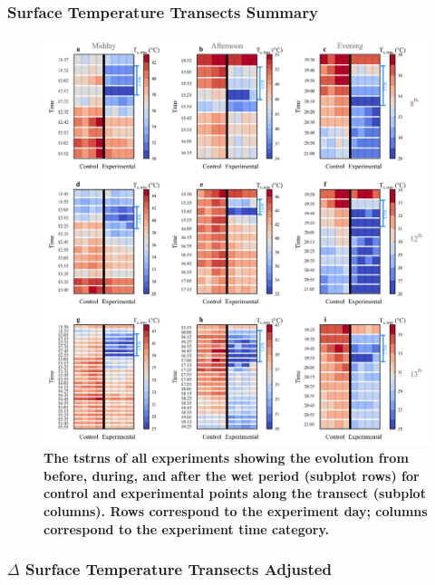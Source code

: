 \documentclass[final,3p,times,authoryear]{elsarticle}
\begin{document}
\subsubsection{Surface Temperature Transects Summary}\label{sec:appendix7.5.8}

\begin{figure}
\centering
\includegraphics[trim={0 0 0 0},clip,scale=1.0]{pict044.png}
\caption{\bf The \gls{tstrns} of all experiments showing the evolution from before, during, and after the wet period (subplot rows) for control and experimental points along the transect (subplot columns). Rows correspond to the experiment day; columns correspond to the experiment time category.}
 \label{fig:7.15}
\end{figure}
\clearpage


\subsubsection{$\Delta$ Surface Temperature Transects Adjusted}\label{sec:appendix7.5.9}
\end{document}
